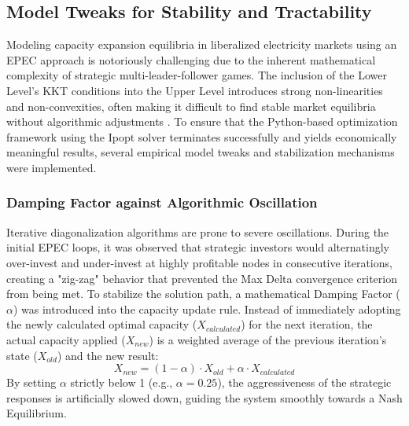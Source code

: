 \subsection{Model Tweaks for Stability and Tractability} \label{subsect:Model_Tweaks}
Modeling capacity expansion equilibria in liberalized electricity markets using an EPEC approach is notoriously challenging due to the inherent mathematical complexity of strategic multi-leader-follower games. The inclusion of the Lower Level's KKT conditions into the Upper Level introduces strong non-linearities and non-convexities, often making it difficult to find stable market equilibria without algorithmic adjustments  \cite{wogrin_capacity_2013, chen_equilibria_2020}. To ensure that the Python-based optimization framework using the Ipopt solver terminates successfully and yields economically meaningful results, several empirical model tweaks and stabilization mechanisms were implemented.

\subsubsection{Damping Factor against Algorithmic Oscillation} \label{subsect:Damping_Factor}
Iterative diagonalization algorithms are prone to severe oscillations. During the initial EPEC loops, it was observed that strategic investors would alternatingly over-invest and under-invest at highly profitable nodes in consecutive iterations, creating a "zig-zag" behavior that prevented the Max Delta convergence criterion from being met. To stabilize the solution path, a mathematical Damping Factor (\(\alpha\)) was introduced into the capacity update rule. Instead of immediately adopting the newly calculated optimal capacity (\(X_{calculated}\)) for the next iteration, the actual capacity applied (\(X_{new}\)) is a weighted average of the previous iteration's state (\(X_{old}\)) and the new result:
\begin{equation}
    X_{new} = (1 - \alpha) \cdot X_{old} + \alpha \cdot X_{calculated}
\end{equation}
 By setting \(\alpha\) strictly below 1 (e.g., \(\alpha=0.25\)), the aggressiveness of the strategic responses is artificially slowed down, guiding the system smoothly towards a Nash Equilibrium.
 
